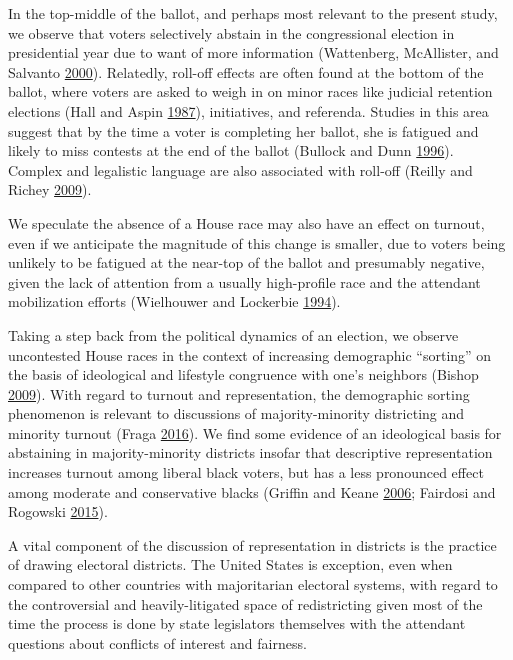 \documentclass[
  12pt,
]{article}
\begin{document}
In the top-middle of the ballot, and perhaps most relevant to the present study, we observe that voters selectively abstain in the congressional election in presidential year due to want of more information (Wattenberg, McAllister, and Salvanto \protect\hyperlink{ref-Wattenberg2000}{2000}). Relatedly, roll-off effects are often found at the bottom of the ballot, where voters are asked to weigh in on minor races like judicial retention elections (Hall and Aspin \protect\hyperlink{ref-Hall1987}{1987}), initiatives, and referenda. Studies in this area suggest that by the time a voter is completing her ballot, she is fatigued and likely to miss contests at the end of the ballot (Bullock and Dunn \protect\hyperlink{ref-Bullock1996}{1996}). Complex and legalistic language are also associated with roll-off (Reilly and Richey \protect\hyperlink{ref-Reilly2009}{2009}).

We speculate the absence of a House race may also have an effect on turnout, even if we anticipate the magnitude of this change is smaller, due to voters being unlikely to be fatigued at the near-top of the ballot and presumably negative, given the lack of attention from a usually high-profile race and the attendant mobilization efforts (Wielhouwer and Lockerbie \protect\hyperlink{ref-Wielhouwer1994}{1994}).

Taking a step back from the political dynamics of an election, we observe uncontested House races in the context of increasing demographic ``sorting'' on the basis of ideological and lifestyle congruence with one's neighbors (Bishop \protect\hyperlink{ref-Bishop2009}{2009}). With regard to turnout and representation, the demographic sorting phenomenon is relevant to discussions of majority-minority districting and minority turnout (Fraga \protect\hyperlink{ref-Fraga2016}{2016}). We find some evidence of an ideological basis for abstaining in majority-minority districts insofar that descriptive representation increases turnout among liberal black voters, but has a less pronounced effect among moderate and conservative blacks (Griffin and Keane \protect\hyperlink{ref-Griffin2006}{2006}; Fairdosi and Rogowski \protect\hyperlink{ref-Fairdosi2015}{2015}).

A vital component of the discussion of representation in districts is the practice of drawing electoral districts. The United States is exception, even when compared to other countries with majoritarian electoral systems, with regard to the controversial and heavily-litigated space of redistricting given most of the time the process is done by state legislators themselves with the attendant questions about conflicts of interest and fairness.
\end{document}
